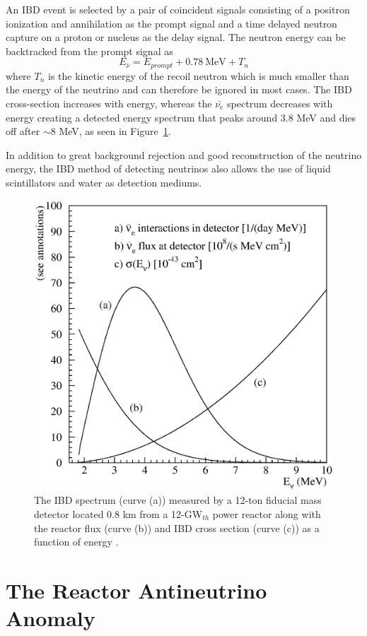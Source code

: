 An IBD event is selected by a pair of coincident signals consisting of a positron ionization and annihilation as the prompt signal and a time delayed neutron capture on a proton or nucleus as the delay signal. 
The neutron energy can be backtracked from the prompt signal as
\begin{equation}	
	E_{\bar{\nu}} = E_{prompt} + 0.78~\textrm{MeV} + T_n
\end{equation}
where $T_n$ is the kinetic energy of the recoil neutron which is much smaller than the energy of the neutrino and can therefore be ignored in most cases. 
The IBD cross-section increases with energy, whereas the $\bar{\nu_{e}}$ spectrum decreases with energy creating a detected energy spectrum that peaks around 3.8 MeV and dies off after $\sim$8 MeV, as seen in Figure~\ref{fig:vogel-fig02}. 

In addition to great background rejection and good reconstruction of the neutrino energy, the IBD method of detecting neutrinos also allows the use of liquid scintillators and water as detection mediums. 

\begin{figure}[h]
	\centering
	\includegraphics[width=0.5\linewidth]{tex/3-reactorneutrinos-images/vogel-fig02}
	\caption{The IBD spectrum (curve (a)) measured by a 12-ton fiducial mass detector located 0.8 km from a 12-GW$_{th}$ power reactor along with the reactor flux (curve (b)) and IBD cross section (curve (c)) as a function of energy \cite{PDG}.}
	\label{fig:vogel-fig02}
\end{figure}




\section{The Reactor Antineutrino Anomaly}






